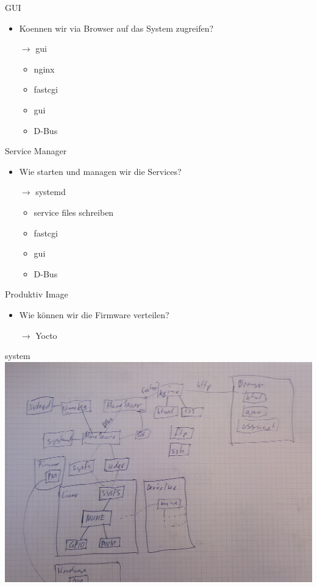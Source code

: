 \begin{frame}{GUI}
	\begin{itemize}
		\item Koennen wir via Browser auf das System zugreifen?
		\item[$\rightarrow$] gui
		\begin{itemize}
			\item nginx
			\item fastcgi
			\item gui
			\item D-Bus
		\end{itemize}
	\end{itemize}
\end{frame}

\begin{frame}{Service Manager}
	\begin{itemize}
		\item Wie starten und managen wir die Services?
		\item[$\rightarrow$] systemd
		\begin{itemize}
			\item service files schreiben
			\item fastcgi
			\item gui
			\item D-Bus
		\end{itemize}
	\end{itemize}
\end{frame}

\begin{frame}{Produktiv Image}
	\begin{itemize}
		\item Wie können wir die Firmware verteilen?
		\item[$\rightarrow$] Yocto
	\end{itemize}
\end{frame}







\begin{frame}{system}
	\includegraphics[width=\textwidth]{res/system.jpg}
\end{frame}

